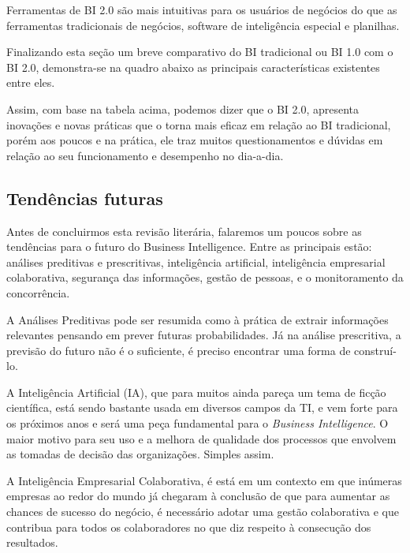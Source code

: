 Ferramentas de BI 2.0 s\~{a}o mais intuitivas para os usu\'{a}rios de neg\'{o}cios do que as ferramentas tradicionais de neg\'{o}cios, software de intelig\^{e}ncia especial e planilhas.

Finalizando esta se\c{c}\~{a}o um breve comparativo do BI tradicional ou BI 1.0 com o BI 2.0, demonstra-se na quadro abaixo as principais caracter\'{i}sticas existentes entre eles.



Assim, com base na tabela acima, podemos dizer que o BI 2.0, apresenta inova\c{c}\~{o}es e novas pr\'{a}ticas que o torna mais eficaz em rela\c{c}\~{a}o ao BI tradicional, por\'{e}m aos poucos e na pr\'{a}tica, ele traz muitos questionamentos e d\'{u}vidas em rela\c{c}\~{a}o ao seu funcionamento e desempenho no dia-a-dia.

\subsection{Tend\^{e}ncias futuras}

Antes de concluirmos esta revis\~{a}o liter\'{a}ria, falaremos um poucos sobre as tend\^{e}ncias para o futuro do Business Intelligence. Entre as principais est\~{a}o: an\'{a}lises preditivas e prescritivas, intelig\^{e}ncia artificial, intelig\^{e}ncia empresarial colaborativa, seguran\c{c}a das informa\c{c}\~{o}es, gest\~{a}o de pessoas, e o monitoramento da concorr\^{e}ncia.

A An\'{a}lises Preditivas pode ser resumida como \`{a} pr\'{a}tica de extrair informa\c{c}\~{o}es relevantes pensando em prever futuras probabilidades. J\'{a} na an\'{a}lise prescritiva, a previs\~{a}o do futuro n\~{a}o \'{e} o suficiente, \'{e} preciso encontrar uma forma de constru\'{i}-lo.

A Intelig\^{e}ncia Artificial (IA), que para muitos ainda pare\c{c}a um tema de fic\c{c}\~{a}o cient\'{i}fica, est\'{a} sendo bastante usada em diversos campos da TI, e vem forte para os pr\'{o}ximos anos e ser\'{a} uma pe\c{c}a fundamental para o \textit{Business Intelligence}. O maior motivo para seu uso e a melhora de qualidade dos processos que envolvem as tomadas de decis\~{a}o das organiza\c{c}\~{o}es. Simples assim.

A Intelig\^{e}ncia Empresarial Colaborativa, \'{e} est\'{a} em um contexto em que inúmeras empresas ao redor do mundo j\'{a} chegaram \`{a} conclus\~{a}o de que para aumentar as chances de sucesso do neg\'{o}cio, \'{e} necess\'{a}rio adotar uma gest\~{a}o colaborativa e que contribua para todos os colaboradores no que diz respeito \`{a} consecu\c{c}\~{a}o dos resultados.

